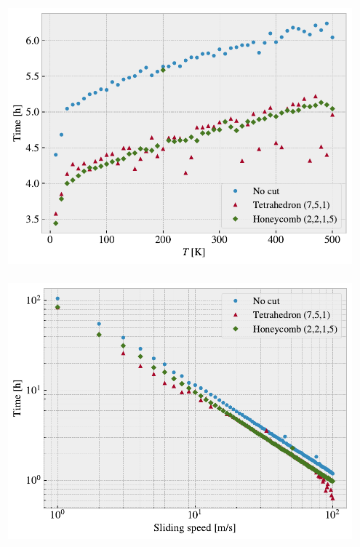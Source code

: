 \begin{figure}[!htb]
  \centering
  \begin{subfigure}[t]{0.49\textwidth}
      \centering
      \includegraphics[width=\textwidth]{figures/baseline/comp_cost_temp.pdf}
      \caption{}
      \label{fig:comp_temp}
    \end{subfigure}
    \hfill
    \begin{subfigure}[t]{0.49\textwidth}
      \centering
      \includegraphics[width=\textwidth]{figures/baseline/comp_cost_vel.pdf}
      \caption{}
      \label{fig:comp_vel}
    \end{subfigure}
    \hfill
    \begin{subfigure}[t]{0.49\textwidth}
      \centering

\end{subfigure}
\end{figure}
